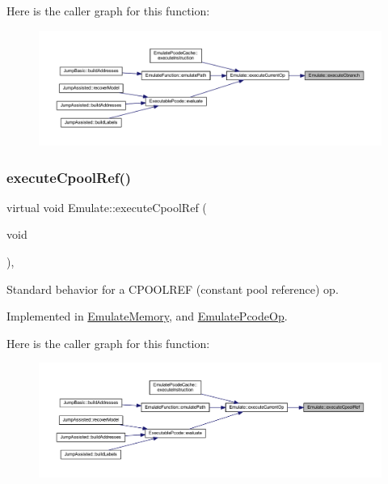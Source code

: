 Here is the caller graph for this function\+:
\nopagebreak
\begin{figure}[H]
\begin{center}
\leavevmode
\includegraphics[width=350pt]{class_emulate_ac0dbab7129d69471d8400a75c0c7c1b5_icgraph}
\end{center}
\end{figure}
\mbox{\label{class_emulate_a544e0f87351d29a0336b56c06fe8b3c3}} 
\subsubsection{\texorpdfstring{executeCpoolRef()}{executeCpoolRef()}}
{\footnotesize\ttfamily virtual void Emulate\+::execute\+Cpool\+Ref (\begin{DoxyParamCaption}\item[{void}]{ }\end{DoxyParamCaption})\hspace{0.3cm}{\ttfamily [protected]}, {}}



Standard behavior for a C\+P\+O\+O\+L\+R\+EF (constant pool reference) op. 



Implemented in \mbox{\hyperlink{class_emulate_memory_a057928f5f600a75a356d8e8e72e8c2cc}{Emulate\+Memory}}, and \mbox{\hyperlink{class_emulate_pcode_op_aa1075926534682debaaab82d47f51a03}{Emulate\+Pcode\+Op}}.

Here is the caller graph for this function\+:
\nopagebreak
\begin{figure}[H]
\begin{center}
\leavevmode
\includegraphics[width=350pt]{class_emulate_a544e0f87351d29a0336b56c06fe8b3c3_icgraph}
\end{center}
\end{figure}
\mbox{\label{class_emulate_aad37ba97a90d7cd5338a75afce3a21b9}} 
